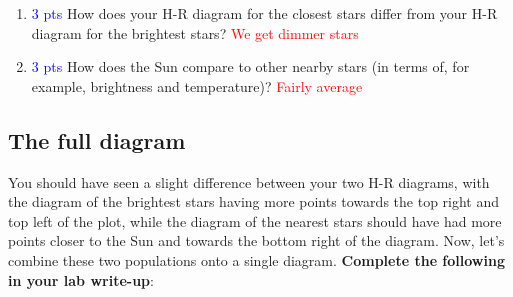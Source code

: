 \documentclass[11pt]{article}
\begin{document}
\begin{enumerate}
    \item \textcolor{blue}{3 pts} How does your H-R diagram for the closest stars differ from your H-R diagram for the brightest stars?
    \textcolor{red}{We get dimmer stars}
    
    \item \textcolor{blue}{3 pts} How does the Sun compare to other nearby stars (in terms of, for example, brightness and temperature)?
    \textcolor{red}{Fairly average}
    
\end{enumerate}

\subsection{The full diagram}
You should have seen a slight difference between your two H-R diagrams, with the diagram of the brightest stars having more points towards the top right and top left of the plot, while the diagram of the nearest stars should have had more points closer to the Sun and towards the bottom right of the diagram. Now, let's combine these two populations onto a single diagram. \textbf{Complete the following in your lab write-up}:
\end{document}
